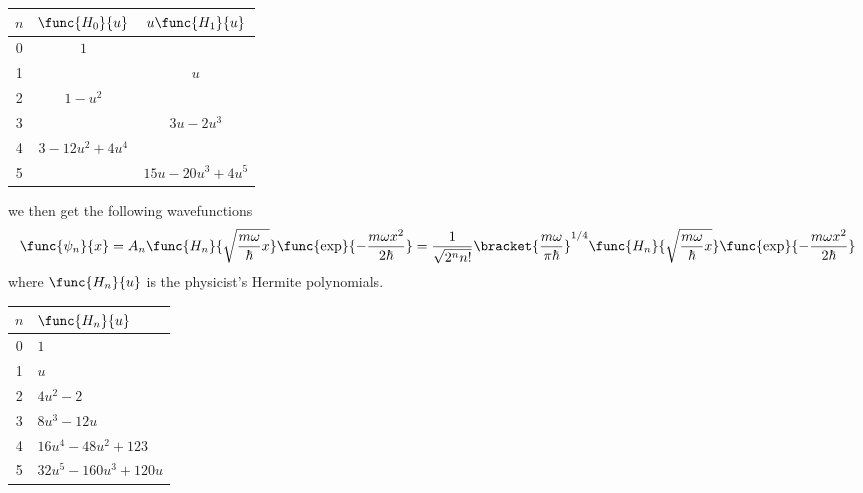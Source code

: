\begin{center}
    \begin{tabular}{c|c|c}
        \(n\) & \(\func{H_0}{u}\) & \(u\func{H_1}{u} \)\\ \hline 
        0 & \(1\) & \\ \hline 
        1 &  & \(u\) \\ \hline 
        2 & \(1 - u^2\) & \\\hline 
        3 &  & \(3u - 2 u^3\) \\\hline
        4 & \(3 - 12 u^2 + 4u^4\) &  \\\hline 
        5 & & \(15u - 20u^3 + 4u^5\) \\
    \end{tabular}
\end{center}
we then get the following wavefunctions
\begin{equation*}
    \func{\psi_n}{x} = A_n \func{H_n}{\sqrt{\frac{m\omega}{\hbar} x}} \func{\exp}{- \frac{m\omega x^2}{2\hbar}} = \dfrac{1}{\sqrt{2^n n!}} \bracket{\dfrac{m\omega}{\pi \hbar}}^{1/4} \func{H_n}{\sqrt{\frac{m\omega}{\hbar} x}} \func{\exp}{- \frac{m\omega x^2}{2\hbar}}
\end{equation*}
where \(\func{H_n}{u}\) is the physicist's Hermite polynomials.
\begin{center}
    \begin{tabular}{c|l}
        \(n\) & \(\func{H_n}{u}\) \\ \hline 
        0 & \(1\)  \\ \hline 
        1 &  \(u\) \\ \hline 
        2 & \(4u^2 - 2\)  \\\hline 
        3 &   \(8u^3 - 12 u\) \\\hline
        4 & \(16u^4 - 48u^2 + 12 3\)  \\\hline 
        5 &  \(32u^5 - 160u^3 + 120u\) \\
    \end{tabular}
\end{center}